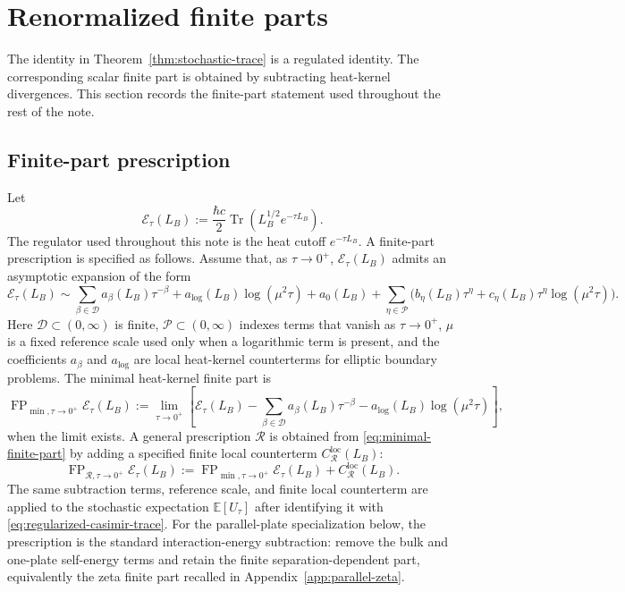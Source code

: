 \documentclass[11pt]{article}
\newcommand{\E}{\mathbb{E}}
\newcommand{\Tr}{\operatorname{Tr}}
\newcommand{\FP}{\operatorname{FP}}
\begin{document}
\section{Renormalized finite parts}
\label{sec:renormalized}

The identity in Theorem~\ref{thm:stochastic-trace} is a regulated identity.  The corresponding scalar finite part is obtained by subtracting heat-kernel divergences.  This section records the finite-part statement used throughout the rest of the note.

\subsection{Finite-part prescription}

Let
\begin{equation}
    \mathcal{E}_\tau(L_B)
    :=\frac{\hbar c}{2}\Tr\left(L_B^{1/2}e^{-\tau L_B}\right).
    \label{eq:regularized-casimir-trace}
\end{equation}
The regulator used throughout this note is the heat cutoff $e^{-\tau L_B}$.  A finite-part prescription is specified as follows.  Assume that, as $\tau\to0^+$, $\mathcal{E}_\tau(L_B)$ admits an asymptotic expansion of the form
\begin{equation}
    \mathcal{E}_\tau(L_B)
    \sim
    \sum_{\beta\in\mathcal D} a_\beta(L_B)\tau^{-\beta}
    +a_{\log}(L_B)\log(\mu^2\tau)
    +a_0(L_B)
    +\sum_{\eta\in\mathcal P}
      \bigl(b_\eta(L_B)\tau^\eta
      +c_\eta(L_B)\tau^\eta\log(\mu^2\tau)\bigr).
    \label{eq:finite-part-expansion}
\end{equation}
Here $\mathcal D\subset(0,\infty)$ is finite, $\mathcal P\subset(0,\infty)$ indexes terms that vanish as $\tau\to0^+$, $\mu$ is a fixed reference scale used only when a logarithmic term is present, and the coefficients $a_\beta$ and $a_{\log}$ are local heat-kernel counterterms for elliptic boundary problems.  The minimal heat-kernel finite part is
\begin{equation}
    \FP_{\min,\tau\to0^+}\mathcal{E}_\tau(L_B)
    :=\lim_{\tau\to0^+}
    \left[\mathcal{E}_\tau(L_B)
      -\sum_{\beta\in\mathcal D} a_\beta(L_B)\tau^{-\beta}
      -a_{\log}(L_B)\log(\mu^2\tau)
    \right],
    \label{eq:minimal-finite-part}
\end{equation}
when the limit exists.  A general prescription $\mathcal R$ is obtained from \eqref{eq:minimal-finite-part} by adding a specified finite local counterterm $C_{\mathcal R}^{\mathrm{loc}}(L_B)$:
\begin{equation}
    \FP_{\mathcal R,\tau\to0^+}\mathcal{E}_\tau(L_B)
    :=\FP_{\min,\tau\to0^+}\mathcal{E}_\tau(L_B)
      +C_{\mathcal R}^{\mathrm{loc}}(L_B).
    \label{eq:R-finite-part}
\end{equation}
The same subtraction terms, reference scale, and finite local counterterm are applied to the stochastic expectation $\E[U_\tau]$ after identifying it with \eqref{eq:regularized-casimir-trace}.  For the parallel-plate specialization below, the prescription is the standard interaction-energy subtraction: remove the bulk and one-plate self-energy terms and retain the finite separation-dependent part, equivalently the zeta finite part recalled in Appendix~\ref{app:parallel-zeta}.
\end{document}
